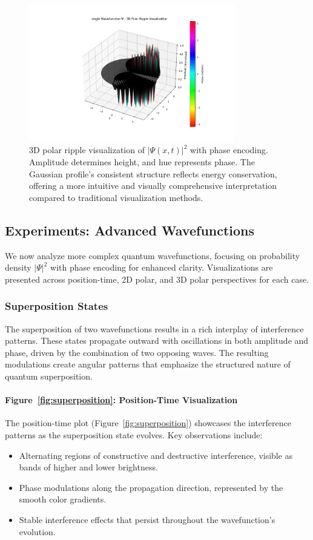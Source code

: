 \documentclass[12pt]{article}
\begin{document}
\begin{figure}[H]
    \centering
    \includegraphics[width=0.8\textwidth]{images/single_wavefunction_3d_polar_probability_density_with_phase.png}
    \caption{3D polar ripple visualization of \(|\Psi(x,t)|^2\) with phase encoding. Amplitude determines height, and hue represents phase. The Gaussian profile's consistent structure reflects energy conservation, offering a more intuitive and visually comprehensive interpretation compared to traditional visualization methods.}
    \label{fig:single_3d_polar_density}
\end{figure}

\subsection{Experiments: Advanced Wavefunctions}
We now analyze more complex quantum wavefunctions, focusing on probability density \(|\Psi|^2\) with phase encoding for enhanced clarity. Visualizations are presented across position-time, 2D polar, and 3D polar perspectives for each case.

\subsubsection{Superposition States}
The superposition of two wavefunctions results in a rich interplay of interference patterns. These states propagate outward with oscillations in both amplitude and phase, driven by the combination of two opposing waves. The resulting modulations create angular patterns that emphasize the structured nature of quantum superposition.

\paragraph{Figure~\ref{fig:superposition}: Position-Time Visualization}
The position-time plot (Figure~\ref{fig:superposition}) showcases the interference patterns as the superposition state evolves. Key observations include:
\begin{itemize}
    \item Alternating regions of constructive and destructive interference, visible as bands of higher and lower brightness.
    \item Phase modulations along the propagation direction, represented by the smooth color gradients.
    \item Stable interference effects that persist throughout the wavefunction's evolution.
\end{itemize}
\end{document}

